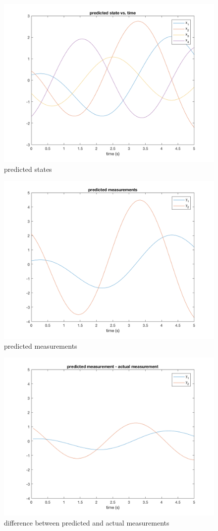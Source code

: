 \documentclass[11pt]{article}
\begin{document}
\begin{figure}[h!]
	\centering
	\includegraphics[width=0.6\linewidth]{1d_state_plot.png}
	\caption{predicted states}
	\label{fig:1d_states}
\end{figure}
\begin{figure}[h!]
	\centering
	\includegraphics[width=0.6\linewidth]{1d_pred_meas.png}
	\caption{predicted measurements}
	\label{fig:1d_meas}
\end{figure}
\begin{figure}[h!]
	\centering
	\includegraphics[width=0.6\linewidth]{1d_meas_diffs.png}
	\caption{difference between predicted and actual measurements}
	\label{fig:1d_diffs}
\end{figure}
\end{document}

